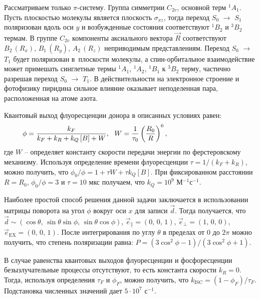  Рассматриваем только $\pi$-систему. Группа симметрии $C_{2v}$, основной терм $^1A_1$. Пусть плоскостью молекулы является плоскость $\sigma_{xz}$, тогда переход $S_0$ $\rightarrow$ $S_1$ поляризован вдоль оси $y$ и возбужденные состояния соответствуют $^1B_2$ и $^3B_2$ термам. В группе $C_{2v}$ компоненты аксиального вектора $\vec{R}$ соответствуют $B_2\,(R_x)$, $B_1\,(R_y)$, $A_2\,(R_z)$ неприводимым представлениям. Переход $S_0$ $\rightarrow$ $T_1$ будет поляризован в~плоскости молекулы, а спин-орбитальное взаимодействие может примешать синглетные термы $^1A_1$, $^1A_2$, $^1B_1$ к $^3B_2$ терму, частично разрешая переход $S_0$ $\rightarrow$ $T_1$. В действительности на электронное строение и фотофизику пиридина сильное влияние оказывает неподеленная пара, расположенная на атоме азота.\par
{} Квантовый выход флуоресценции донора в описанных условиях равен:
\begin{equation*}
\begin{aligned}
& \phi = \dfrac{k_F}{k_F + k_R + k_Q \left[ B \right] + W},\,\,\,\, W = \dfrac{1}{\tau_0} \left( \dfrac{R_0}{R} \right) ^6, \hspace{32mm}
\end{aligned}
\end{equation*}
где $W$ – определяет константу скорости передачи энергии по ферстеровскому механизму. Используя определение времени флуоресценции $\tau = 1/\left( k_F + k_R \right)$, можно получить, что $\phi_0 / \phi = 1 + \tau W + \tau k_Q \left[ B \right]$. При фиксированном расстоянии $R=R_0$, $\phi_0 / \phi = \text{3}$ и $\tau = \text{10}$ мкс получаем, что $k_Q = \text{10}^\text{9}$ М$^{-1}$с$^{-1}$.\par
{} Наиболее простой способ решения данной задачи заключается в использовании матрицы поворота на угол $\phi$ вокруг оси $x$ для записи $\vec{d}$. Тогда получается, что $\vec{d} \sim (\cos{\theta},\, \sin{\theta}\sin{\phi},\, \sin{\theta}\cos{\phi})$, $\vec{e}_{\parallel} = (0,\,0,\,1)$, $\vec{e}_{\perp} = (1,\,0,\,0)$, $\vec{e}_{\text{EX}} = (0,\, 0,\, 1)$. После интегрирования по углу $\theta$ в пределах от 0 до $2\pi$ можно получить, что степень поляризации равна: $P = (3\cos^2{\phi} - 1)/(3\cos^2{\phi} + 1).$
\par
{} В случае равенства квантовых выходов флуоресценции и фосфоресценции безызлучательные процессы отсутствуют, то есть константа скорости $k_R = 0$. Тогда, используя определения $\tau_{F}$ и $\phi_F$, можно получить, что $k_{\text{ISC}} = \left( 1 - \phi_{F} \right) / \tau_{F}$. Подстановка численных значений дает $\text{5} \cdot \text{10}^{\text{7}}$ с$^{-1}$.\par
